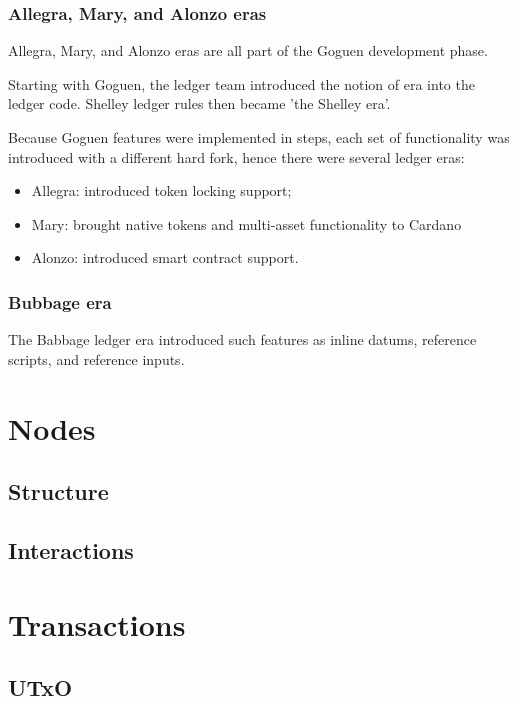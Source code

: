 \vspace{0.5cm}

\subsubsection{Allegra, Mary, and Alonzo eras}

Allegra, Mary, and Alonzo eras are all part of the Goguen development phase.

\vspace{0.2cm}

\noindent
Starting with Goguen, the ledger team introduced the notion of era into the ledger code. 
Shelley ledger rules then became 'the Shelley era'.

\vspace{0.2cm}

\noindent
Because Goguen features were implemented in steps, each set of functionality was introduced 
with a different hard fork, hence there were several ledger eras:
\begin{itemize}
    \item Allegra: introduced token locking support;
    \item Mary: brought native tokens and multi-asset functionality to Cardano
    \item Alonzo: introduced smart contract support.
\end{itemize}

\vspace{0.5cm}

\subsubsection{Bubbage era}

The Babbage ledger era introduced such features as inline datums, reference scripts, and 
reference inputs.

\section{Nodes}

\subsection{Structure}

\subsection{Interactions}

\section{Transactions}

\subsection{UTxO}